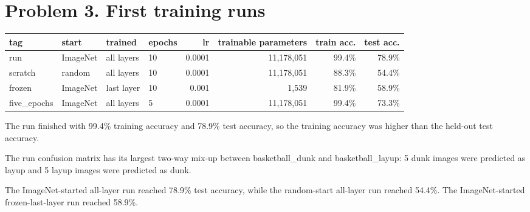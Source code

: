 \documentclass[11pt]{article}
\begin{document}

\section*{Problem 3. First training runs}

\begin{center}\footnotesize
\begin{tabular}{llllrrrr}
\toprule
tag & start & trained & epochs & lr & trainable parameters & train acc. & test acc. \\
\midrule
run & ImageNet & all layers & 10 & 0.0001 & 11,178,051 & 99.4\% & 78.9\% \\
scratch & random & all layers & 10 & 0.0001 & 11,178,051 & 88.3\% & 54.4\% \\
frozen & ImageNet & last layer & 10 & 0.001 & 1,539 & 81.9\% & 58.9\% \\
five\_epochs & ImageNet & all layers & 5 & 0.0001 & 11,178,051 & 99.4\% & 73.3\% \\
\bottomrule
\end{tabular}
\end{center}


The run finished with 99.4\% training accuracy and 78.9\% test accuracy, so the training accuracy was higher than the held-out test accuracy. 

\begin{center}\end{center}

The run confusion matrix has its largest two-way mix-up between basketball\_dunk and basketball\_layup: 5 dunk images were predicted as layup and 5 layup images were predicted as dunk. 

The ImageNet-started all-layer run reached 78.9\% test accuracy, while the random-start all-layer run reached 54.4\%. The ImageNet-started frozen-last-layer run reached 58.9\%. 
\end{document}
